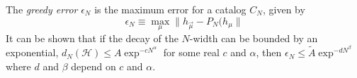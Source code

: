 The \textit{greedy error} $\epsilon_N$ is the maximum error for a catalog $C_N$, given by
\begin{equation}
\epsilon_N \equiv \max_\mu \| h_{\overrightarrow{\mu}} - P_N(h_{\mu} \|
\end{equation}
It can be shown that if the decay of the $N$-width can be bounded by an exponential, $d_N(\mathcal{H}) \leq A \exp^{-c N^\alpha}$ for some real $c$ and $\alpha$, then $\epsilon_N  \leq \tilde{A} \exp^{-d N^\beta}$ where $d$ and $\beta$ depend on $c$ and $\alpha$. 

